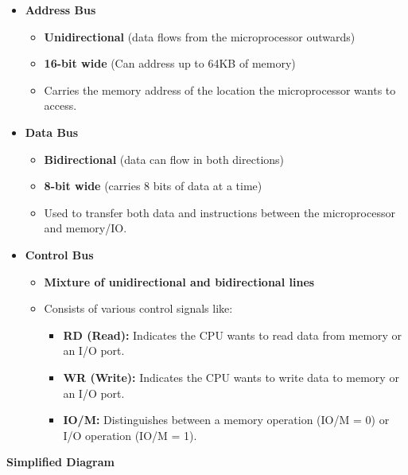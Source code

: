 \documentclass[
]{article}
\begin{document}
\begin{itemize}
\item
  \textbf{Address Bus}

  \begin{itemize}
  \item
    \textbf{Unidirectional} (data flows from the microprocessor
    outwards)
  \item
    \textbf{16-bit wide} (Can address up to 64KB of memory)
  \item
    Carries the memory address of the location the microprocessor wants
    to access.
  \end{itemize}
\item
  \textbf{Data Bus}

  \begin{itemize}
  \item
    \textbf{Bidirectional} (data can flow in both directions)
  \item
    \textbf{8-bit wide} (carries 8 bits of data at a time)
  \item
    Used to transfer both data and instructions between the
    microprocessor and memory/IO.
  \end{itemize}
\item
  \textbf{Control Bus}

  \begin{itemize}
  \item
    \textbf{Mixture of unidirectional and bidirectional lines}
  \item
    Consists of various control signals like:

    \begin{itemize}
    \item
      \textbf{RD (Read):} Indicates the CPU wants to read data from
      memory or an I/O port.
    \item
      \textbf{WR (Write):} Indicates the CPU wants to write data to
      memory or an I/O port.
    \item
      \textbf{IO/M:} Distinguishes between a memory operation (IO/M = 0)
      or I/O operation (IO/M = 1).
    \end{itemize}
  \end{itemize}
\end{itemize}

\textbf{Simplified Diagram}
\end{document}
